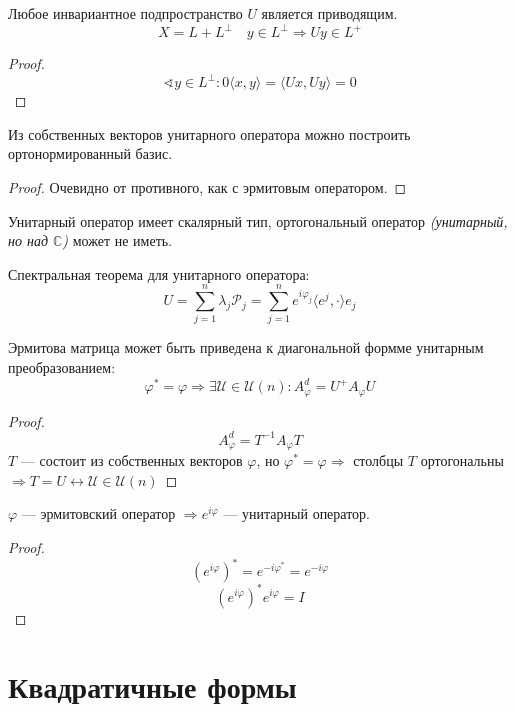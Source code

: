 \begin{lemma}
    Любое инвариантное подпространство $U$ является приводящим.
    $$X = L + L^\perp \quad y\in L^\perp \Rightarrow Uy \in L^+$$
\end{lemma}
\begin{proof}
    $$\sphericalangle y\in L^\perp : 0 \langle x, y\rangle = \langle Ux, Uy\rangle=0$$
\end{proof}
\begin{theorem}
    Из собственных векторов унитарного оператора можно построить ортонормированный базис.
\end{theorem}
\begin{proof}
    Очевидно от противного, как с эрмитовым оператором.
\end{proof}

\begin{remark}
    Унитарный оператор имеет скалярный тип, ортогональный оператор \textit{(унитарный, но над $\mathbb{C}$)} может не иметь.
\end{remark}

\begin{theorem}
    Спектральная теорема для унитарного оператора:
    $$U=\sum_{j=1}^n \lambda_j \mathcal P_j = \sum_{j=1}^n e^{i\varphi_j}\langle e^j, \cdot \rangle e_j$$
\end{theorem}

\begin{theorem}
    Эрмитова матрица может быть приведена к диагональной формме унитарным преобразованием:
    $$\varphi^* = \varphi \Rightarrow \exists \mathcal U\in \mathcal U(n) : A_\varphi^d = U^+A_\varphi U$$
\end{theorem}
\begin{proof}
    $$A_\varphi^d = T^{-1}A_\varphi T$$
    $T$ --- состоит из собственных векторов $\varphi$, но $\varphi^*=\varphi \Rightarrow$ столбцы $T$ ортогональны $\Rightarrow T = U \leftrightarrow \mathcal U\in\mathcal U(n)$
\end{proof}

\begin{remark}
    $\varphi$ --- эрмитовский оператор $\Rightarrow e^{i\varphi}$ --- унитарный оператор.
\end{remark}
\begin{proof}
    $$(e^{i\varphi})^* = e^{-i\varphi^*}=e^{-i\varphi}$$
    $$(e^{i\varphi})^*e^{i\varphi}=I$$
\end{proof}

\section*{Квадратичные формы}

